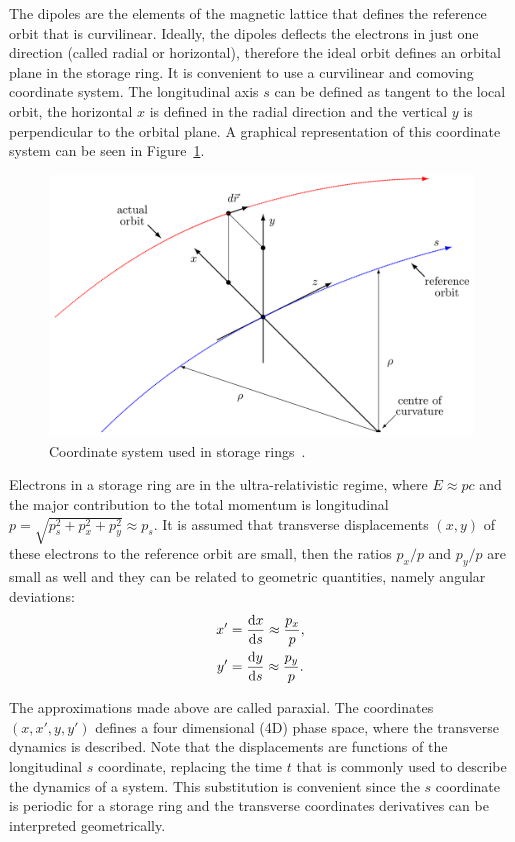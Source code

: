 The dipoles are the elements of the magnetic lattice that defines the reference orbit that is curvilinear. Ideally, the dipoles deflects the electrons in just one direction (called radial or horizontal), therefore the ideal orbit defines an orbital plane in the storage ring. It is convenient to use a curvilinear and comoving coordinate system. The longitudinal axis $s$ can be defined as tangent to the local orbit, the horizontal $x$ is defined in the radial direction and the vertical $y$ is perpendicular to the orbital plane. A graphical representation of this coordinate system can be seen in Figure~\ref{syst}.
\begin{figure}
    \centering
    \includegraphics[scale=0.25]{figures/reference_system.png}
    \caption{Coordinate system used in storage rings~\cite{madx}.}
    \label{syst}
\end{figure}

Electrons in a storage ring are in the ultra-relativistic regime, where $E \approx pc$ and the major contribution to the total momentum is longitudinal $p = \sqrt{p_s^2 + p_x^2 + p_y^2} \approx p_s$. It is assumed that transverse displacements $(x, y)$ of these electrons to the reference orbit are small, then the ratios $p_x/p$ and $p_y/p$ are small as well and they can be related to geometric quantities, namely angular deviations:
\begin{align*}
    x' &= \frac{\mathrm{d} x}{\mathrm{d} s} \approx \frac{p_x}{p}, \\
    y' &= \frac{\mathrm{d} y}{\mathrm{d} s} \approx \frac{p_y}{p}.
\end{align*}

The approximations made above are called paraxial. The coordinates $(x, x', y, y')$ defines a four dimensional (4D) phase space, where the transverse dynamics is described. Note that the displacements are functions of the longitudinal $s$ coordinate, replacing the time $t$ that is commonly used to describe the dynamics of a system. This substitution is convenient since the $s$ coordinate is periodic for a storage ring and the transverse coordinates derivatives can be interpreted geometrically.

